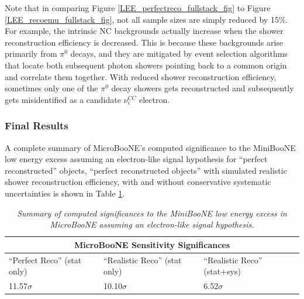 Note that in comparing Figure \ref{LEE_perfectreco_fullstack_fig} to Figure \ref{LEE_recoemu_fullstack_fig}, not all sample sizes are simply reduced by 15\%. For example, the intrinsic NC backgrounds actually increase when the shower reconstruction efficiency is decreased. This is because these backgrounds arise primarily from $\pi^0$ decays, and they are mitigated by event selection algorithms that locate both subsequent photon showers pointing back to a common origin and correlate them together. With reduced shower reconstruction efficiency, sometimes only one of the $\pi^0$ decay showers gets reconstructed and subsequently gets misidentified as a candidate $\nu_e^{CC}$ electron.


\subsubsection{Final Results}

A complete summary of MicroBooNE's computed significance to the MiniBooNE low energy excess assuming an electron-like signal hypothesis for ``perfect reconstructed'' objects, ``perfect reconstructed objects'' with simulated realistic shower reconstruction efficiency, with and without conservative systematic uncertainties is shown in Table \ref{LEE_final_significance_table}.

\begin{table}
\begin{tabular}{ |p{5 cm}|p{5 cm}|p{5 cm}|  }
 \hline
 \multicolumn{3}{|c|}{MicroBooNE Sensitivity Significances} \\
 \hline
 ``Perfect Reco'' (stat only) & ``Realistic Reco'' (stat only) & ``Realistic Reco'' (stat+sys) \\
 \hline \hline
 11.57$\sigma$ & 10.10$\sigma$ & 6.52$\sigma$\\\hline
 
 \hline
\end{tabular}
\caption{\textit{Summary of computed significances to the MiniBooNE low energy excess in MicroBooNE assuming an electron-like signal hypothesis.}}\label{LEE_final_significance_table}
\end{table}



